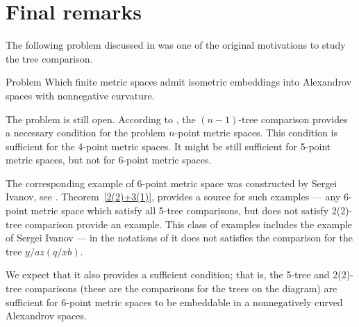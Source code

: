 \section{Final remarks}

The following problem discussed in \cite[7.1]{AKP} was one of the original motivations to study the tree comparison.

\begin{thm}{Problem}
Which finite metric spaces admit isometric embeddings into Alexandrov spaces with nonnegative curvature.
\end{thm}

The problem is still open.
According to \cite[4.1]{AKP}, the $(n-1)$-tree comparison provides a necessary condition for the problem $n$-point metric spaces.
This condition is sufficient for the 4-point metric spaces.
It might be still sufficient for 5-point metric spaces,
but not for 6-point metric spaces.

The corresponding example of 6-point metric space was constructed by Sergei Ivanov, see \cite{AKP}.
Theorem~\ref{2(2)+3(1)}, provides a source for such examples --- any 6-point metric space which satisfy all 5-tree comparisons, but does not satisfy 2(2)-tree comparison provide an example.
This class of examples includes the example of Sergei Ivanov --- in the notations of \cite[7.1]{AKP} it does not satisfies the comparison for the tree $y/az(q/xb)$.

We expect that it also provides a sufficient condition;
that is, the 5-tree and 2(2)-tree comparisons (these are the comparisons for the trees on the diagram) are sufficient for 6-point metric spaces to be embeddable in a nonnegatively curved Alexandrov spaces. 
\hide
\begin{center}
\hskip10mm

\end{center}
\unhide

